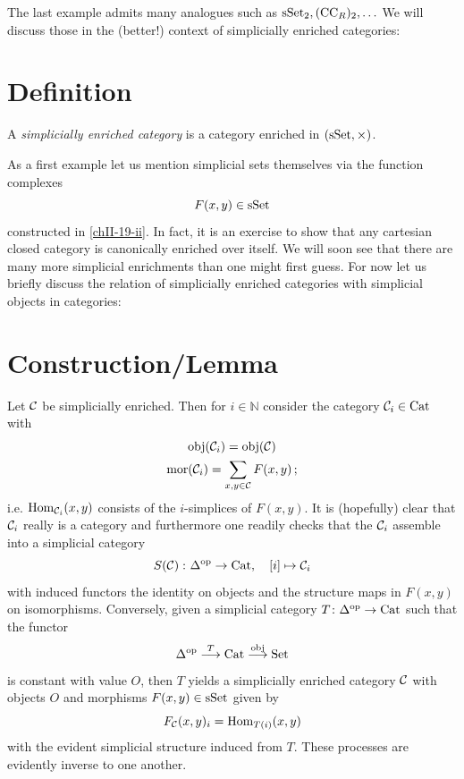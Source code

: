         The last example admits many analogues such as $\operatorname{sSet}_2, (\text{CC}_R)_2, \ldots$ We will discuss those in the (better!) context of simplicially enriched categories:

    \section{Definition}
        A \emph{simplicially enriched category} is a category enriched in $(\operatorname{sSet}, \times)$.
        \smallskip

        As a first example let us mention simplicial sets themselves via the function complexes
        \begin{equation*}
            F(x, y) \in \operatorname{sSet}
        \end{equation*}
        constructed in \ref{chII-19-ii}. In fact, it is an exercise to show that any cartesian closed category is canonically enriched over itself. We will soon see that there are many more simplicial enrichments than one might first guess. For now let us briefly discuss the relation of simplicially enriched categories with simplicial objects in categories:

        \section{Construction/Lemma}\label{chIV-15}
            Let $\mathcal{C}$ be simplicially enriched. Then for $i \in \mathbb{N}$ consider the category $\mathcal{C}_i \in \operatorname{Cat}$ with
            \begin{gather*}
                \operatorname{obj}(\mathcal{C}_i) = \operatorname{obj}(\mathcal{C}) \\
                \operatorname{mor}(\mathcal{C}_i) = \sum_{x, y \in \mathcal{C}}F(x, y) \,;
            \end{gather*}
            i.e. $\operatorname{Hom}_{\mathcal{C}_i}(x, y)$ consists of the $i$-simplices of $F(x, y)$. It is (hopefully) clear that $\mathcal{C}_i$ really is a category and furthermore one readily checks that the $\mathcal{C}_i$ assemble into a simplicial category
            \begin{equation*}
                S(\mathcal{C}) \,\colon \Delta^{\operatorname{op}} \to \operatorname{Cat}, \quad [i] \mapsto \mathcal{C}_i
            \end{equation*}
            with induced functors the identity on objects and the structure maps in $F(x, y)$ on isomorphisms. Conversely, given a simplicial category $T \colon \Delta^{\operatorname{op}} \to \operatorname{Cat}$ such that the functor
            \begin{equation*}
                \Delta^{\operatorname{op}} \overset{T}{\longrightarrow} \operatorname{Cat} \overset{\operatorname{obj}}{\longrightarrow} \operatorname{Set}
            \end{equation*}
            is constant with value $O$, then $T$ yields a simplicially enriched category $\mathcal{C}$ with objects $O$ and morphisms $F(x, y) \in \operatorname{sSet}$ given by
            \begin{equation*}
                F_{\mathcal{C}}(x, y)_i = \operatorname{Hom}_{T(i)}(x, y)
            \end{equation*}
            with the evident simplicial structure induced from $T$. These processes are evidently inverse to one another.

